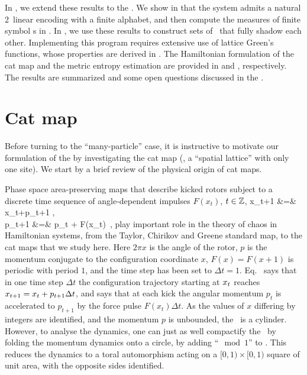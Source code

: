 \documentclass[12pt]{iopart}
\begin{document}
In , we extend these results to the \catlatt. We show
in   that the system admits  a natural
2\dmn\ linear encoding with a finite alphabet,
and then  compute the measures of finite
{\spt} symbol \brick s  in .
In ,  we use these  results to construct
sets of {\spt} \twots\ that fully  shadow each other.
Implementing this program requires extensive use of lattice Green's
functions, whose properties  are derived in .
The  Hamiltonian formulation of the {\spt} cat map and the
metric entropy estimation are provided in  
and , respectively.
The results are summarized and some open questions discussed in the
.

\section{Cat map}
\label{sect:catMap}

Before turning to the ``many-particle'' case, it is instructive to motivate
our formulation of the {\catlatt} by investigating the {cat map}
(\ie, a ``spatial lattice'' with only one site).
We start by a brief review of the physical origin of cat maps.

Phase space area-preserving maps that describe kicked rotors subject to a
discrete time sequence of angle-dependent impulses $F(x_{t})$,
$t\in\mathbb{Z}$,
\bea
x_{t+1} &=& x_{t}+p_{t+1} \qquad  {}, \label{PerViv2.1b}
    \\
p_{t+1} &=& p_{t} + F(x_{t})             \label{PerViv2.1a}
\,,
\eea
play important role in the theory of chaos in Hamiltonian systems, from the
Taylor, Chirikov and Greene  standard map, to
the cat maps that we study here. Here $2\pi x$ is the  angle of the rotor,
$p$ is the momentum conjugate to the configuration coordinate $x$,
$F(x)=F(x+1)$ is periodic with period $1$, and the time step has been set to
$\Delta t= 1$.
Eq.~ says that in one time step $\Delta t$ the
configuration trajectory starting at $x_{t}$ reaches $x_{t+1} =
x_{t}+p_{t+1}\Delta t$, and  says that at each kick
the angular momentum $p_{t}$ is accelerated to $p_{t+1}$ by the force
pulse $F(x_{t})\Delta t$. As the values of $x$ differing by integers are
identified, and the momentum $p$ is unbounded, the \statesp\ is a
cylinder. However, to analyse the dynamics, one can just as well
compactify the \statesp\ by folding the momentum dynamics onto a circle,
by adding ``$\mod 1$'' to . This reduces the dynamics
to a toral automorphism acting on a  $[0,1)\times [0,1)$ square of unit
area, with the opposite sides identified.
\end{document}
